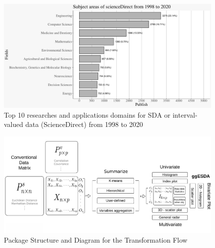 \documentclass[article]{jss}
\begin{document}
\begin{appendix}
\begin{figure}[t!]
\centering	 		
\includegraphics[width=1\textwidth]{pic/subjectFig} 
\caption{\label{fig:subjectAreas} Top 10 researches and applications domains for SDA or interval-valued data (ScienceDirect) from 1998 to 2020}  		   			 		 
\end{figure}



\begin{figure}[t!]
\centering	 			 	
\includegraphics[width=1\textwidth]{pic/packageStructure2} 
\caption{\label{fig:pkgStr} Package Structure and Diagram for the Transformation Flow}  
\end{figure}




\end{appendix}
\end{document}
